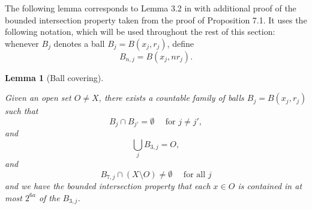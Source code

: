\documentclass[10pt,a4paper]{article}
\theoremstyle{plain}
\newtheorem{lemma}[theorem]{Lemma}
\theoremstyle{definition}
\numberwithin{equation}{subsection}
\newcommand{\lean}[1]{}
\newcommand{\uses}[1]{}
\newcommand{\leanok}{}
\begin{document}
The following lemma corresponds to Lemma 3.2 in \cite{stein-book} with additional proof of the bounded intersection property taken from the proof of Proposition 7.1.
It uses the following notation, which will be used throughout the rest of this section: whenever $B_j$ denotes a ball $B_j = B(x_j, r_j)$, define
\begin{equation*}
    B_{n,j} = B(x_j, nr_j).
\end{equation*}
\begin{lemma}[Ball covering]
    \label{ball-covering}
    \leanok
    \lean{ball_covering}
    \uses{disjoint-family-countable}
    Given an open set $O\ne X$, there exists a countable family of balls $B_j = B(x_j, r_j)$ such that
    \begin{equation}
        \label{balls-disjoint}
        B_j \cap B_{j'} = \emptyset \quad \text{ for } j \ne j',
    \end{equation}
    and
    \begin{equation}
        \label{balls-covering}
        \bigcup_j B_{3,j} = O,
    \end{equation}
    and
    \begin{equation}
        \label{enlarged-balls-intersect-complement}
        B_{7,j} \cap (X \setminus O) \ne \emptyset \quad \text{ for all } j
    \end{equation}
    and we have the bounded intersection property that each $x\in O$ is contained in at most $2^{6a}$ of the $B_{3,j}$.
\end{lemma}
\end{document}
